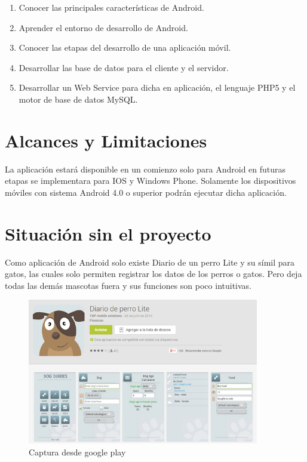 \documentclass[letterpaper,12pt,openany,oneside]{book}
\begin{document}
\begin{enumerate}
 \item Conocer las principales caracter\'isticas de Android. 
 \item Aprender el entorno de desarrollo de Android.
 \item Conocer las etapas del desarrollo de una aplicaci\'on móvil.
 \item Desarrollar las base de datos para el cliente y el servidor.
 \item Desarrollar un Web Service para dicha en aplicación, el lenguaje PHP5 y el motor de base de datos MySQL.

\end{enumerate}

\section{Alcances y Limitaciones}

La aplicación estará disponible en un comienzo solo para Android en futuras etapas se implementara para IOS y Windows Phone.  Solamente los dispositivos móviles con sistema Android 4.0 o superior podrán ejecutar dicha aplicación.

\newpage

\section{Situaci\'on sin el proyecto}

Como aplicación de Android solo existe  Diario de un perro Lite y su símil para gatos, las cuales solo permiten registrar los datos de los perros o gatos. Pero deja todas las demás mascotas fuera y sus funciones son poco intuitivas.

\begin{figure}[!ht]
  \centering
    \includegraphics[width=0.9\textwidth]{antes.png}
  \caption{Captura desde google play}
  \label{fig:Captura desde google play}
\end{figure}
\end{document}
